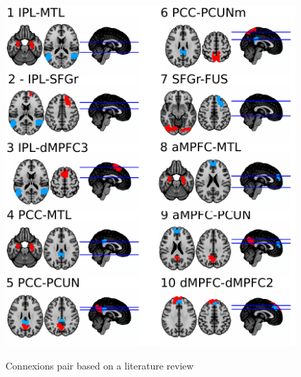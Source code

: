 \documentclass[authoryear]{elsarticle}
\begin{document}
\begin{figure}
\begin{center}
\includegraphics[width=0.5\linewidth]{../figures/p2p_seeds.pdf}
\end{center}
\tiny{Connexions pair based on a literature review}
\label{fig_p2p}
\end{figure}
\end{document}
